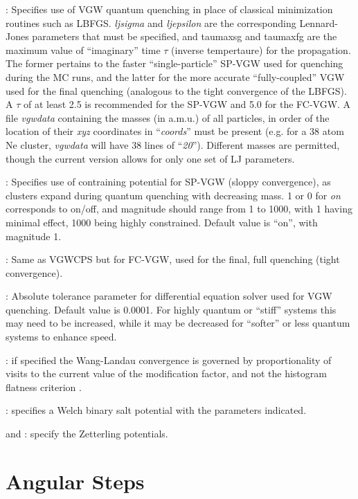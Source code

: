 {: Specifies use of VGW quantum quenching in place of
classical minimization routines such as LBFGS. {\it ljsigma} and {\it ljepsilon} are the corresponding Lennard-Jones
parameters that must be specified, and taumaxsg and taumaxfg are the maximum value of ``imaginary'' time $\tau$ (inverse tempertaure) for the propagation.
The former pertains to the faster ``single-particle'' SP-VGW used for quenching during the MC runs, and the latter for the more accurate
``fully-coupled'' VGW used for the final quenching (analogous to the tight convergence of the LBFGS). A $\tau$ of at least
2.5 is recommended for the SP-VGW and 5.0 for the FC-VGW. A file {\it vgwdata} containing the masses (in a.m.u.) of all particles, in order of the location
of their {\it xyz} coordinates in ``{\it coords}'' must be present (e.g. for a 38 atom Ne cluster, {\it vgwdata} will have 38 lines of ``{\it 20}''). Different
masses are permitted, though the current version allows for only one set of LJ parameters. 

: Specifies use of contraining potential for SP-VGW (sloppy convergence), as clusters expand during quantum quenching
with decreasing mass. 1 or 0 for {\it on} corresponds to on/off,
and magnitude should range from 1 to 1000, with 1 having minimal effect, 1000 being highly constrained. Default value is ``on'', with magnitude 1.

: Same as VGWCPS but for FC-VGW, used for the final, full quenching (tight convergence).

: Absolute tolerance parameter for differential equation solver used for VGW quenching. Default value is 0.0001.
For highly quantum or ``stiff'' systems this may need to be increased, while it may be decreased for ``softer'' or less quantum systems to enhance
speed.
 
: if specified the Wang-Landau convergence is governed by proportionality of visits to the current value of
the modification factor, and not the histogram flatness criterion \cite{ZhouB03}.

: specifies a Welch binary
salt potential with the parameters indicated.

 and {\/}: specify the Zetterling potentials.

\section{Angular Steps}

}
